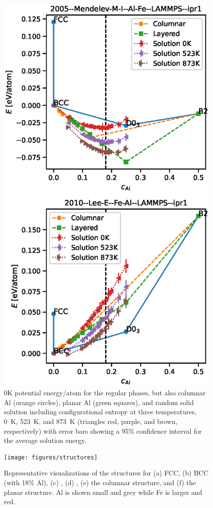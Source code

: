 \begin{figure}[h]
    \centering
    \includegraphics[width=\textwidth]{figures/expanded_0K_phases}
    \caption{0K potential energy/atom for the regular phases, but also columnar Al (orange circles), planar Al (green squares), and random solid solution including configurational entropy at three temperatures, 0~K, 523~K, and 873~K (triangles red, purple, and brown, respectively) with error bars showing a 95\% confidence interval for the average solution energy.}
    \label{fig:expanded_0K_phases}
\end{figure}
%
\begin{figure}[h]
    \centering
    \texttt{[image: figures/structures]}
    \caption{Representative visualizations of the structures for (a) FCC, (b) BCC (with 18\% Al), (c) \DOTHREE, (d) \BTWO, (e) the columnar structure, and (f) the planar structure. Al is shown small and grey while Fe is larger and red.}
    \label{fig:structures}
\end{figure}

